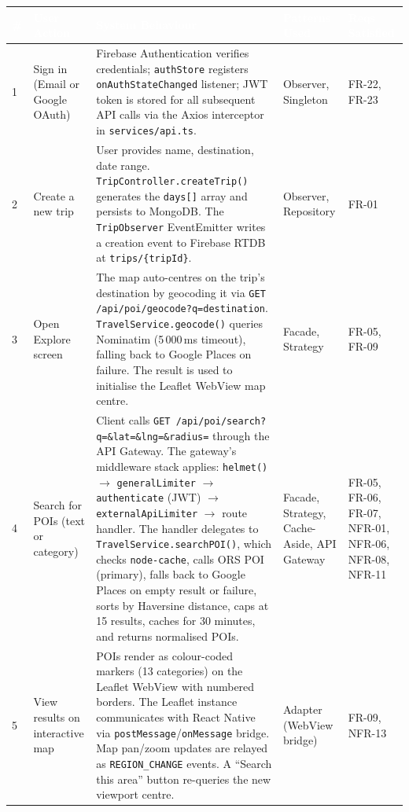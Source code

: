\documentclass[12pt, a4paper]{article}
\newcommand{\thcell}[1]{\textcolor{white}{\textbf{\small #1}}}
\newcommand{\code}[1]{\texttt{\small #1}}
\newcommand{\reqid}[1]{\textsc{\small #1}}
\begin{document}
\begin{longtable}{C{0.6cm} L{2.8cm} L{4.8cm} L{2.2cm} L{2.5cm}}
\toprule
{}
\thcell{\#} & \thcell{User Action} & \thcell{System Behaviour} & \thcell{Patterns Used} & \thcell{Reqs Satisfied} \\
\midrule
\endhead
\bottomrule
\endfoot

1 & Sign in (Email or Google OAuth) &
Firebase Authentication verifies credentials; \code{authStore} registers \code{onAuthStateChanged} listener; JWT token is stored for all subsequent API calls via the Axios interceptor in \code{services/api.ts}. &
Observer, Singleton &
\reqid{FR-22}, \reqid{FR-23} \\

2 & Create a new trip &
User provides name, destination, date range. \code{TripController.createTrip()} generates the \code{days[]} array and persists to MongoDB. The \code{TripObserver} EventEmitter writes a creation event to Firebase RTDB at \code{trips/\{tripId\}}. &
Observer, Repository &
\reqid{FR-01} \\

3 & Open Explore screen &
The map auto-centres on the trip's destination by geocoding it via \code{GET /api/poi/geocode?q=destination}. \code{TravelService.geocode()} queries Nominatim (5\,000\,ms timeout), falling back to Google Places on failure. The result is used to initialise the Leaflet WebView map centre. &
Facade, Strategy &
\reqid{FR-05}, \reqid{FR-09} \\

4 & Search for POIs (text or category) &
Client calls \code{GET /api/poi/search?q=\&lat=\&lng=\&radius=} through the API Gateway. The gateway's middleware stack applies: \code{helmet()} $\to$ \code{generalLimiter} $\to$ \code{authenticate} (JWT) $\to$ \code{externalApiLimiter} $\to$ route handler. The handler delegates to \code{TravelService.searchPOI()}, which checks \code{node-cache}, calls ORS POI (primary), falls back to Google Places on empty result or failure, sorts by Haversine distance, caps at 15 results, caches for 30 minutes, and returns normalised POIs. &
Facade, Strategy, Cache-Aside, API Gateway &
\reqid{FR-05}, \reqid{FR-06}, \reqid{FR-07}, \reqid{NFR-01}, \reqid{NFR-06}, \reqid{NFR-08}, \reqid{NFR-11} \\

5 & View results on interactive map &
POIs render as colour-coded markers (13 categories) on the Leaflet WebView with numbered borders. The Leaflet instance communicates with React Native via \code{postMessage}/\code{onMessage} bridge. Map pan/zoom updates are relayed as \code{REGION\_CHANGE} events. A ``Search this area'' button re-queries the new viewport centre. &
Adapter (WebView bridge) &
\reqid{FR-09}, \reqid{NFR-13} \\


\end{longtable}
\end{document}
